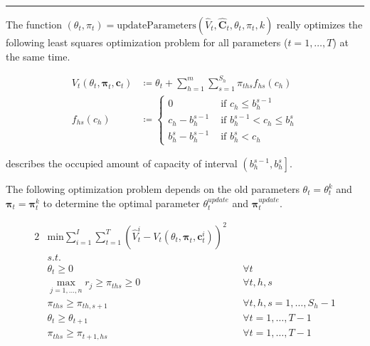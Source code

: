 \documentclass{scrbook}
\begin{document}
\noindent\rule{\textwidth}{1pt}
The function $\left(\theta_t, \pi_t \right) = \text{updateParameters}\left(\hat{V}_t, \mathbf{\hat{C}}_t, \theta_t, \pi_t, k\right)$ really optimizes the following least squares optimization problem for all parameters ($t = 1, \dots, T$) at the same time.

\begin{align}
	V_t(\theta_t, \mathbf{\pi}_t, \mathbf{c}_t) & \coloneqq \theta_t + \sum_{h=1}^{m}\sum_{s=1}^{S_h} \pi_{ths} f_{hs}(c_h) \\
	f_{hs}(c_h) &\coloneqq 
	\begin{cases}\label{def-f}
		0 & \text{ if } c_h \leq b_h^{s-1}\\
		c_h - b_h^{s-1} & \text{ if } b_h^{s-1} < c_h \leq b_h^s \\
		b_h^s - b_h^{s-1} & \text{ if } b_h^s < c_h
	\end{cases}
\end{align}

 describes the occupied amount of capacity of interval $\left(b_h^{s-1}, b_h^s\right]$.

The following optimization problem depends on the old parameters $\theta_t = \theta_t^k$ and $\mathbf{\pi}_t = \mathbf{\pi}_t^k$ to determine the optimal parameter $\theta_t^{update}$ and $\mathbf{\pi}_t^{update}$.

\begin{alignat}{2}
 & \text{min} \sum_{i=1}^{I}\sum_{t=1}^{T} \left( \hat{V}_t^i - V_t(\theta_t, \mathbf{\pi}_t, \mathbf{c}_t^i) \right)^2 && \\
 & s.t. && \\
 & \theta_t \geq 0 && \forall t\\
 & \max_{j=1, \dots, n} r_j \geq \pi_{ths} \geq 0 && \forall t, h, s\\
 & \pi_{ths} \geq \pi_{th,s+1} && \forall t, h, s = 1, \dots, S_h-1\\
 & \theta_t \geq \theta_{t+1} && \forall t = 1, \dots, T-1\\
 & \pi_{ths} \geq \pi_{t+1,hs} && \forall t = 1, \dots, T-1
\end{alignat}
\end{document}
